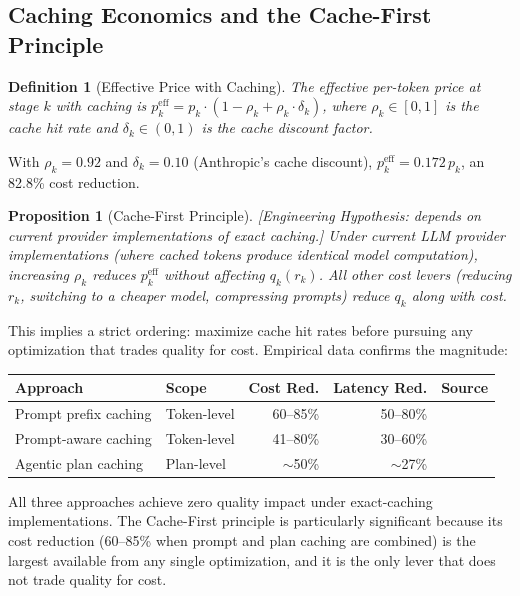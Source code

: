 \documentclass[11pt, a4paper]{googledeepmind}
\newtheorem{definition}{Definition}[section]
\newtheorem{proposition}{Proposition}[section]
\begin{document}
\subsection{Caching Economics and the Cache-First Principle}

\begin{definition}[Effective Price with Caching]
\label{def:econ-cache-price}
The effective per-token price at stage $k$ with caching is $p_k^{\text{eff}} = p_k \cdot (1 - \rho_k + \rho_k \cdot \delta_k)$, where $\rho_k \in [0,1]$ is the cache hit rate and $\delta_k \in (0,1)$ is the cache discount factor.
\end{definition}

With $\rho_k = 0.92$ and $\delta_k = 0.10$ (Anthropic's cache discount), $p_k^{\text{eff}} = 0.172 \, p_k$, an 82.8\% cost reduction.

\begin{proposition}[Cache-First Principle]
\label{prop:econ-cache-first}
\emph{[Engineering Hypothesis: depends on current provider implementations of exact caching.]}
Under current LLM provider implementations (where cached tokens produce identical model computation), increasing $\rho_k$ reduces $p_k^{\text{eff}}$ without affecting $q_k(r_k)$. All other cost levers (reducing $r_k$, switching to a cheaper model, compressing prompts) reduce $q_k$ along with cost.
\end{proposition}

This implies a strict ordering: maximize cache hit rates before pursuing any optimization that trades quality for cost. Empirical data confirms the magnitude:

\begin{center}
\small
\begin{tabular}{llrrl}
\toprule
\textbf{Approach} & \textbf{Scope} & \textbf{Cost Red.} & \textbf{Latency Red.} & \textbf{Source} \\
\midrule
Prompt prefix caching & Token-level & 60--85\% & 50--80\% & \citep{anthropic2026coding} \\
Prompt-aware caching & Token-level & 41--80\% & 30--60\% & \citep{liang2026cache} \\
Agentic plan caching & Plan-level & $\sim$50\% & $\sim$27\% & \citep{zhang2025plancache} \\
\bottomrule
\end{tabular}
\end{center}

All three approaches achieve zero quality impact under exact-caching implementations. The Cache-First principle is particularly significant because its cost reduction (60--85\% when prompt and plan caching are combined) is the largest available from any single optimization, and it is the only lever that does not trade quality for cost.
\end{document}
